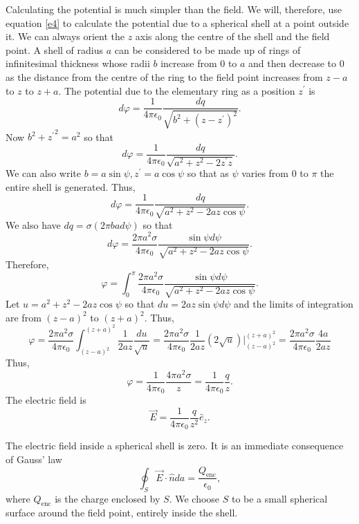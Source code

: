 \documentclass{article}
\newcommand{\un}{\hat{n}}
\newcommand{\uv}[1]{\hat{e}_{#1}}
\newcommand{\op}{\prime}
\newcommand{\ke}{\frac{1}{4\pi\epsilon_0}}
\begin{document}
\begin{enumerate}
Calculating the potential is much simpler than the field. We will, therefore, use
equation \eqref{e4} to calculate the potential due to a spherical shell at a point 
outside it. We can always orient the $z$ axis along the centre of the shell and the
field point. A shell of 
radius $a$ can be considered to be made up of rings of infinitesimal thickness whose
radii $b$ increase from $0$ to $a$ and then decrease to $0$ as the distance from the
centre of the ring to the field point increases from $z - a$ to $z$ to $z + a$. The
potential due to the elementary ring as a position $z^\op$ is
\[
d\varphi = \ke \frac{dq}{\sqrt{b^2 + (z - z^\op)^2}}.
\]
Now $b^2 + {z^\op}^2 = a^2$ so that
\[
d\varphi = \ke \frac{dq}{\sqrt{a^2 + z^2 - 2z^\op z}}.
\]
We can also write $b = a\sin\psi, z^\op = a\cos\psi$ so that as $\psi$ varies from
$0$ to $\pi$ the entire shell is generated. Thus,
\[
d\varphi = \ke \frac{dq}{\sqrt{a^2 + z^2 - 2az\cos\psi}}.
\]
We also have $dq = \sigma (2\pi b ad\psi)$ so that
\[
d\varphi = \frac{2\pi a^2 \sigma}{4\pi\epsilon_0} \frac{\sin\psi d\psi}{\sqrt{a^2 + z^2 - 2az\cos\psi}}.
\]
Therefore,
\[
\varphi = \int_0^\pi \frac{2\pi a^2 \sigma}{4\pi\epsilon_0} \frac{\sin\psi d\psi}{\sqrt{a^2 + z^2 - 2az\cos\psi}}.
\]
Let $u = a^2 + z^2 - 2az\cos\psi$ so that $du = 2az\sin\psi d\psi$ and the 
limits of integration are from $(z - a)^2$ to $(z + a)^2$. Thus,
\[
\varphi = \frac{2\pi a^2 \sigma}{4\pi\epsilon_0}\int_{(z-a)^2}^{(z+a)^2}\frac{1}{2az} \frac{du}{\sqrt{u}}
= \frac{2\pi a^2 \sigma}{4\pi\epsilon_0}\frac{1}{2az} (2\sqrt{u})\Big|_{(z-a)^2}^{(z+a)^2} = 
\frac{2\pi a^2 \sigma}{4\pi\epsilon_0}\frac{4a}{2az}
\]
Thus,
\begin{equation}\label{e5}
\varphi = \ke \frac{4\pi a^2\sigma}{z} = \ke \frac{q}{z}.
\end{equation}
The electric field is
\begin{equation}\label{e6}
\vec{E} = \ke \frac{q}{z^2}\uv{z}.
\end{equation}

The electric field inside a spherical shell is zero. It is an immediate consequence
of Gauss' law
\[
\oint_S\vec{E}\cdot\un da = \frac{Q_{\text{enc}}}{\epsilon_0},
\]
where $Q_{\text{enc}}$ is the charge enclosed by $S$. We choose $S$ to be a small
spherical surface around the field point, entirely inside the shell.


\end{enumerate}
\end{document}

